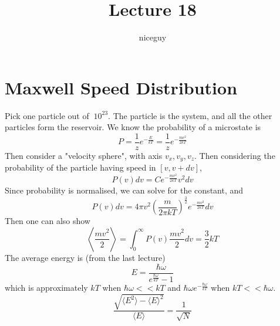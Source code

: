 \documentclass[12pt]{article}
\author{niceguy}
\title{Lecture 18}
\begin{document}
\maketitle

\section{Maxwell Speed Distribution}

Pick one particle out of $~10^{23}$. The particle is the system, and all the other particles form the reservoir. We know the probability of a microstate is
$$P = \frac{1}{z} e^{-\frac{E}{kT}} = \frac{1}{z} e^{-\frac{mc^2}{2kT}}$$
Then consider a "velocity sphere", with axis $v_x,v_y,v_z$. Then considering the probability of the particle having speed in $[v,v+dv]$,
$$P(v)dv = Ce^{-\frac{mv^2}{2kT}}v^2dv$$
Since probability is normalised, we can solve for the constant, and
$$P(v)dv = 4\pi v^2 \left(\frac{m}{2\pi kT}\right)^{\frac{3}{2}} e^{-\frac{mv^2}{2kT}}dv$$
Then one can also show
$$\left\langle \frac{mv^2}{2} \right\rangle = \int_0^\infty P(v) \frac{mv^2}{2}dv = \frac{3}{2}kT$$
The average energy is (from the last lecture)
$$E = \frac{\hbar\omega}{e^{\frac{\hbar\omega}{kT}}-1}$$
which is approximately $kT$ when $\hbar\omega << kT$ and $\hbar\omega e^{-\frac{\hbar\omega}{kT}}$ when $kT << \hbar\omega$.
$$\frac{\sqrt{\langle E^2 \rangle - \langle E \rangle^2}}{\langle E \rangle} = \frac{1}{\sqrt{N}}$$
\end{document}
